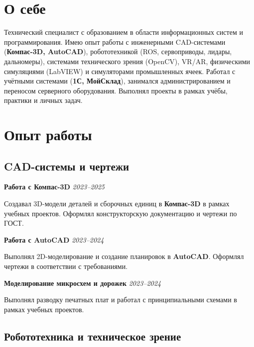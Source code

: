\documentclass[10pt,a4paper]{article}
\newcommand{\projectEntry}[3]{\textbf{#1} \hfill \textit{#2}\par #3\par\vspace{0.3em}}
\begin{document}

\section{О себе}

Технический специалист с образованием в области информационных систем и программирования. Имею опыт работы с инженерными CAD-системами (\textbf{Компас-3D, AutoCAD}), робототехникой (ROS, сервоприводы, лидары, дальномеры), системами технического зрения (OpenCV), VR/AR, физическими симуляциями (LabVIEW) и симуляторами промышленных ячеек. Работал с учётными системами (\textbf{1С, МойСклад}), занимался администрированием и переносом серверного оборудования. Выполнял проекты в рамках учёбы, практики и личных задач.

\section{Опыт работы}

\subsection{CAD-системы и чертежи}

\projectEntry{Работа с Компас-3D}{2023–2025}
{Создавал 3D-модели деталей и сборочных единиц в \textbf{Компас-3D} в рамках учебных проектов. Оформлял конструкторскую документацию и чертежи по ГОСТ.}

\projectEntry{Работа с AutoCAD}{2023–2024}
{Выполнял 2D-моделирование и создание планировок в \textbf{AutoCAD}. Оформлял чертежи в соответствии с требованиями.}

\projectEntry{Моделирование микросхем и дорожек}{2023–2024}
{Выполнял разводку печатных плат и работал с принципиальными схемами в рамках учебных проектов.}

\subsection{Робототехника и техническое зрение}
\end{document}
